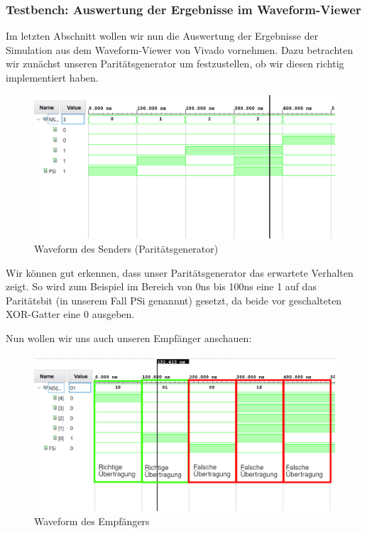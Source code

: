\documentclass{article}
\begin{document}
\subsubsection{Testbench: Auswertung der Ergebnisse im Waveform-Viewer}

Im letzten Abschnitt wollen wir nun die Auswertung der Ergebnisse der Simulation aus dem Waveform-Viewer von Vivado vornehmen. Dazu betrachten wir zunächst unseren Paritätsgenerator um festzustellen, ob wir diesen richtig implementiert haben.

\begin{figure}[h]
  \centering
  \includegraphics[width=\textwidth]{../assets/images/DI1/senderTBSim.PNG}
  \caption{Waveform des Senders (Paritätsgenerator)}
  \label{fig:wf1}
\end{figure}

Wir können gut erkennen, dass unser Paritätsgenerator das erwartete Verhalten zeigt. So wird zum Beispiel im Bereich von 0ns bis 100ns eine 1 auf das Paritätsbit (in unserem Fall PSi genannnt) gesetzt, da beide vor geschalteten XOR-Gatter eine 0 ausgeben.

\newpage
Nun wollen wir uns auch unseren Empfänger anschauen:

\begin{figure}[h]
  \centering
  \includegraphics[width=\textwidth]{../assets/images/DI1/receiverTBSim.PNG}
  \caption{Waveform des Empfängers}
  \label{fig:wf2}
\end{figure}
\end{document}
